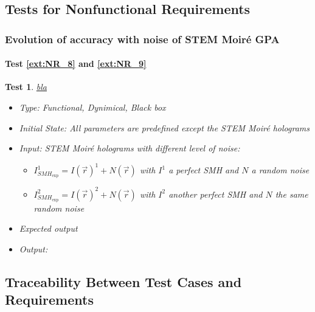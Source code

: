 \documentclass[12pt, titlepage]{article}
\newcommand{\progname}{STEM Moir{\'e} GPA}
\newtheorem{Test}{Test}
\begin{document}
\subsection{Tests for Nonfunctional Requirements}

\subsubsection{Evolution of accuracy with noise of \progname{}}
		
\paragraph{Test \cref{ext:NR_8} and \cref{ext:NR_9}}						

\begin{Test}\normalfont\underline{bla}
\begin{itemize}
\item Type: Functional, Dynimical, Black box
\item Initial State: All parameters are predefined except the STEM Moir{\'e} holograms
\item Input: STEM Moir{\'e} holograms with different level of noise: 
	\begin{itemize}
	\item	$I_{\mathit{SMH}_\text{exp}}^{1} = I(\vec{r})^{1} + N(\vec{r})$ with $I^1$ a perfect SMH and $N$ a random noise
	\item  $I_{\mathit{SMH}_\text{exp}}^{2} = I(\vec{r})^{2} + N(\vec{r})$ with $I^2$ another perfect SMH and $N$ the same random noise
	\end{itemize}

\item Expected output
\item Output:  
\end{itemize}
\end{Test}	

\subsection{Traceability Between Test Cases and Requirements}


		
\end{document}
